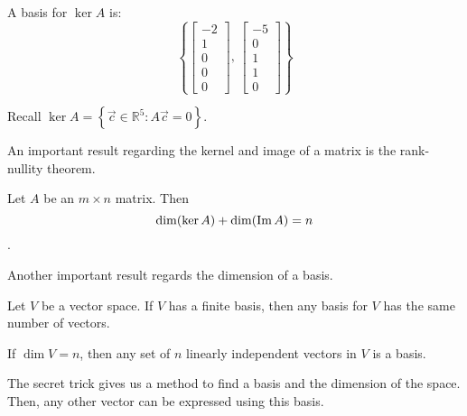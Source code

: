 \documentclass[../main.tex]{subfiles}
\begin{document}
\begin{example}[]
    A basis for \( \ker A \) is:
    \[
        \left\{
            \begin{bmatrix} -2 \\ 1 \\ 0 \\ 0 \\ 0 \end{bmatrix}, \,
            \begin{bmatrix} -5 \\ 0 \\ 1 \\ 1 \\ 0 \end{bmatrix}
        \right\}
     \]
    
    Recall \( \ker A =\left\{ \vec{c} \in \mathbb{R}^5 : A\vec{c} =0 \right\} \).
\end{example}

An important result regarding the kernel and image of a matrix is the rank-nullity theorem.

\begin{theorem}
    Let \( A \) be an \( m \times n \) matrix. Then \[ \dim(\ker A) + \dim(\operatorname{Im} A) = n \].
\end{theorem}

Another important result regards the dimension of a basis.

\begin{theorem}[]
    Let \( V \) be a vector space. If \( V \) has a finite basis, then any basis for \( V \) has the same number of vectors.
\end{theorem}

\begin{corollary}
    If \( \dim V = n \), then any set of \( n \) linearly independent vectors in \( V \) is a basis.
\end{corollary}

The secret trick gives us a method to find a basis and the dimension of the space. Then, any other vector can be expressed
using this basis.
\end{document}
